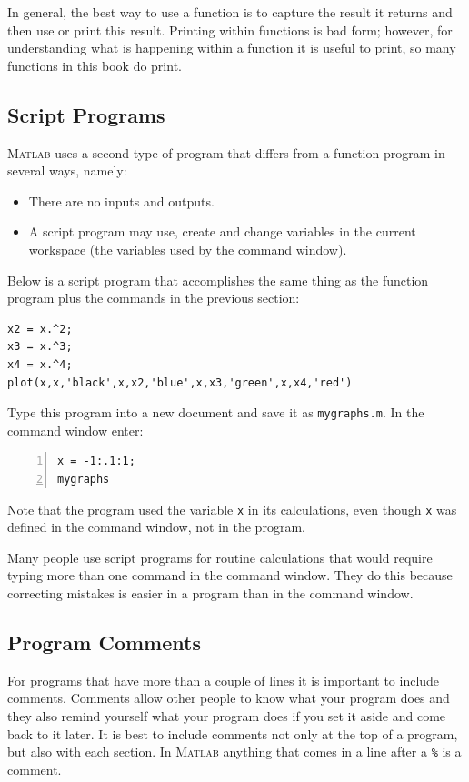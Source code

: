 In general, the best way to use a function is to capture the result
it returns and then use or print this result.
Printing within functions is bad form; however, for
understanding what is happening within a function it is useful to print, so many
functions in this book do print.



\subsection*{Script Programs}

\textsc{Matlab} uses a second type of program that differs from
a function program in several ways, namely:
\begin{itemize}
\item There are no inputs and outputs.
\item A script program may use, create  and change variables in the current
  workspace (the variables used by the command window).
\end{itemize}
Below is a script program that accomplishes the same thing as
the function program plus the commands in the previous section:
\begin{lstlisting}
x2 = x.^2;
x3 = x.^3;
x4 = x.^4;
plot(x,x,'black',x,x2,'blue',x,x3,'green',x,x4,'red')
\end{lstlisting}

Type this program into a new document and save it as \verb&mygraphs.m&.
In the command window enter:
\begin{lstlisting}[frame=none,numbers=left]
x = -1:.1:1;
mygraphs
\end{lstlisting}
Note that the program used the variable \verb&x& in its calculations, even
though \verb&x& was defined in the command window, not in the program.

Many people use script programs for routine calculations that
would require typing more than one
command in the command window. They do this because correcting
mistakes is easier in a program than in the command window.


\subsection*{Program Comments}

For programs that have more than a couple of lines it
is important to include comments. Comments allow other
people to know what your program does and they also
remind yourself what your program does if you set it
aside and come back to it later. It is best to include
comments not only at the top of a program, but also
with each section. In \textsc{Matlab} anything that
comes in a line after a \verb&%& 
is a comment.

